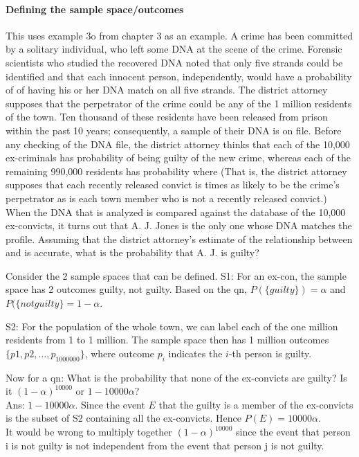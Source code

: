 \documentclass{article}
\begin{document}
\paragraph{Defining the sample space/outcomes}
This uses example 3o from chapter 3 as an example.
A crime has been committed by a solitary individual, who left some DNA at the
scene of the crime. Forensic scientists who studied the recovered DNA noted
that only five strands could be identified and that each innocent person,
independently, would have a probability of of having his or her DNA match
on all five strands. The district attorney supposes that the perpetrator of the crime
could be any of the 1 million residents of the town. Ten thousand of these
residents have been released from prison within the past 10 years; consequently,
a sample of their DNA is on file. Before any checking of the DNA file, the district
attorney thinks that each of the 10,000 ex-criminals has probability of being
guilty of the new crime, whereas each of the remaining 990,000 residents has
probability where (That is, the district attorney supposes that each
recently released convict is times as likely to be the crime’s perpetrator as is
each town member who is not a recently released convict.) When the DNA that is
analyzed is compared against the database of the 10,000 ex-convicts, it turns out
that A. J. Jones is the only one whose DNA matches the profile. Assuming that
the district attorney’s estimate of the relationship between and is accurate,
what is the probability that A. J. is guilty?

Consider the 2 sample spaces that can be defined.
S1: For an ex-con, the sample space has 2 outcomes {guilty, not guilty}. Based on the qn, $P(\{guilty\}) = \alpha$ and $P(\{not guilty\}=1-\alpha$.

S2: For the population of the whole town, we can label each of the one million residents from 1 to 1 million. The sample space then has 1 million outcomes $\{p1, p2, \dots, p_{1000000}\}$, where outcome $p_i$ indicates the $i$-th person is guilty.

Now for a qn: What is the probability that none of the ex-convicts are guilty?
Is it $(1-\alpha)^{10000}$ or $1-10000\alpha$?\\
Ans: $1-10000\alpha$. Since the event $E$ that the guilty is a member of the ex-convicts is the subset of S2 containing all the ex-convicts. Hence $P(E)=10000\alpha$.\\
It would be wrong to multiply together $(1-\alpha)^{10000}$ since the event that person i is not guilty is not independent from the event that person j is not guilty.
\end{document}

